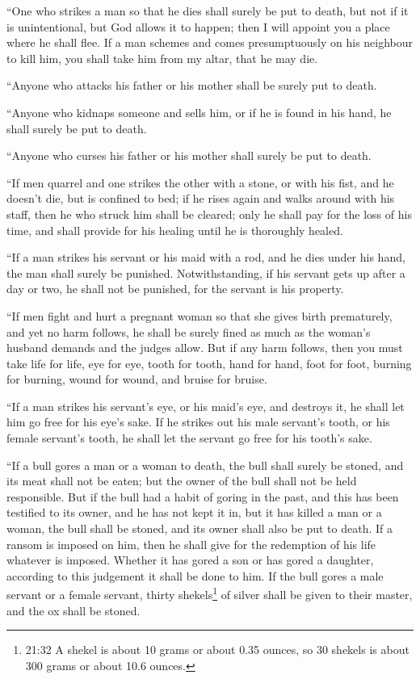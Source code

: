  ``One who strikes a man so that he dies shall surely be
put to death,  but not if it is unintentional, but God
allows it to happen; then I will appoint you a place where he shall
flee.  If a man schemes and comes presumptuously on his
neighbour to kill him, you shall take him from my altar, that he may
die.

 ``Anyone who attacks his father or his mother shall be
surely put to death.

 ``Anyone who kidnaps someone and sells him, or if he is
found in his hand, he shall surely be put to death.

 ``Anyone who curses his father or his mother shall surely
be put to death.

 ``If men quarrel and one strikes the other with a stone,
or with his fist, and he doesn't die, but is confined to bed;
 if he rises again and walks around with his staff, then he
who struck him shall be cleared; only he shall pay for the loss of his
time, and shall provide for his healing until he is thoroughly healed.

 ``If a man strikes his servant or his maid with a rod, and
he dies under his hand, the man shall surely be punished. 
Notwithstanding, if his servant gets up after a day or two, he shall not
be punished, for the servant is his property.

 ``If men fight and hurt a pregnant woman so that she gives
birth prematurely, and yet no harm follows, he shall be surely fined as
much as the woman's husband demands and the judges allow. 
But if any harm follows, then you must take life for life, 
eye for eye, tooth for tooth, hand for hand, foot for foot,
 burning for burning, wound for wound, and bruise for
bruise.

 ``If a man strikes his servant's eye, or his maid's eye,
and destroys it, he shall let him go free for his eye's sake.
 If he strikes out his male servant's tooth, or his female
servant's tooth, he shall let the servant go free for his tooth's sake.

 ``If a bull gores a man or a woman to death, the bull
shall surely be stoned, and its meat shall not be eaten; but the owner
of the bull shall not be held responsible.  But if the bull
had a habit of goring in the past, and this has been testified to its
owner, and he has not kept it in, but it has killed a man or a woman,
the bull shall be stoned, and its owner shall also be put to death.
 If a ransom is imposed on him, then he shall give for the
redemption of his life whatever is imposed.  Whether it has
gored a son or has gored a daughter, according to this judgement it
shall be done to him.  If the bull gores a male servant or
a female servant, thirty shekels\footnote{21:32 A shekel is about 10
  grams or about 0.35 ounces, so 30 shekels is about 300 grams or about
  10.6 ounces.} of silver shall be given to their master, and the ox
shall be stoned.

